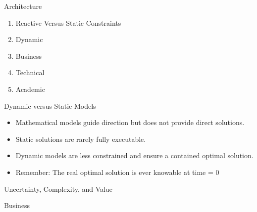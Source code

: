 \documentclass{beamer}
\begin{document}
\begin{frame}[t]{Architecture}
\end{frame}

\begin{frame}[t]{}
    \begin{block}{}
        \begin{enumerate}
			\item Reactive Versus Static Constraints
			\item Dynamic
            \item Business
            \item Technical
            \item Academic
        \end{enumerate}
    \end{block}
\end{frame}

\begin{frame}[t]{}
    \begin{block}{Dynamic versus Static Models}
			
			\drawReactiveConstraints{}

		\begin{itemize}
			\item Mathematical models guide direction but does not provide direct solutions.
			\item Static solutions are rarely fully executable.
			\item Dynamic models are less constrained and ensure a contained optimal solution.
			\item Remember: The real optimal solution is ever knowable at time = 0
		\end{itemize}
    \end{block}
\end{frame}

\begin{frame}[t]{}
    \begin{block}{Uncertainty, Complexity, and Value}
		
    \end{block}
\end{frame}

\begin{frame}[t]{}
    \begin{block}{}
    \end{block}
\end{frame}

\begin{frame}[t]{}
    \begin{block}{}
		
    \end{block}
\end{frame}

\begin{frame}{}
    \begin{block}{Business}
    \end{block}
\end{frame}
\end{document}
